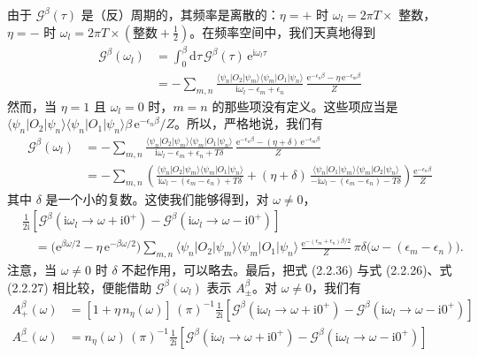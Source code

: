 由于 $\mathcal{G}^{\beta}(\tau)$ 是（反）周期的，其频率是离散的：$\eta = +$ 时 $\omega_l = 2\pi T \times$ 整数，$\eta = -$ 时 $\omega_l = 2\pi T \times (\text{整数} + \frac{1}{2})$。在频率空间中，我们天真地得到
\begin{align*}
\mathcal{G}^{\beta}(\omega_l) &= \int_0^{\beta} \mathrm{d}\tau\, \mathcal{G}^{\beta}(\tau)\, \mathrm{e}^{\mathrm{i}\omega_l \tau}
\\
&= -\sum_{m,n} \frac{\langle\psi_n|O_2|\psi_m\rangle\langle\psi_m|O_1|\psi_n\rangle}{\mathrm{i}\omega_l - \epsilon_m + \epsilon_n}\, \frac{\mathrm{e}^{-\epsilon_n\beta} - \eta\,\mathrm{e}^{-\epsilon_m\beta}}{Z}
\end{align*}
然而，当 $\eta = 1$ 且 $\omega_l = 0$ 时，$m = n$ 的那些项没有定义。这些项应当是 $\langle\psi_n|O_2|\psi_n\rangle\allowbreak\langle\psi_n|O_1|\psi_n\rangle \beta\allowbreak\, \mathrm{e}^{-\epsilon_n\beta}/Z$。所以，严格地说，我们有
\begin{align*}
\mathcal{G}^{\beta}(\omega_l) &= -\sum_{m,n} \frac{\langle\psi_n|O_2|\psi_m\rangle\langle\psi_m|O_1|\psi_n\rangle}{\mathrm{i}\omega_l - \epsilon_m + \epsilon_n + T\delta}\, \frac{\mathrm{e}^{-\epsilon_n\beta} - (\eta + \delta)\,\mathrm{e}^{-\epsilon_m\beta}}{Z} \tag{2.2.35}
\\
&= -\sum_{m,n} \left( \frac{\langle\psi_n|O_2|\psi_m\rangle\langle\psi_m|O_1|\psi_n\rangle}{\mathrm{i}\omega_l - (\epsilon_m - \epsilon_n) + T\delta} + (\eta + \delta)\, \frac{\langle\psi_n|O_1|\psi_m\rangle\langle\psi_m|O_2|\psi_n\rangle}{-\mathrm{i}\omega_l - (\epsilon_m - \epsilon_n) - T\delta} \right) \frac{\mathrm{e}^{-\epsilon_n\beta}}{Z}
\end{align*}
其中 $\delta$ 是一个小的复数。这使我们能够得到，对 $\omega \neq 0$，
\begin{align*}
&\frac{1}{2\mathrm{i}}\left[ \mathcal{G}^{\beta}(\mathrm{i}\omega_l \to \omega + \mathrm{i}0^{+}) - \mathcal{G}^{\beta}(\mathrm{i}\omega_l \to \omega - \mathrm{i}0^{+}) \right] \tag{2.2.36}
\\
&\quad = \bigl(\mathrm{e}^{\beta\omega/2} - \eta\,\mathrm{e}^{-\beta\omega/2}\bigr) \sum_{m,n} \langle\psi_n|O_2|\psi_m\rangle\langle\psi_m|O_1|\psi_n\rangle\, \frac{\mathrm{e}^{-(\epsilon_m + \epsilon_n)\beta/2}}{Z}\, \pi\delta\bigl(\omega - (\epsilon_m - \epsilon_n)\bigr).
\end{align*}
注意，当 $\omega \neq 0$ 时 $\delta$ 不起作用，可以略去。最后，把式 (2.2.36) 与式 (2.2.26)、式 (2.2.27) 相比较，便能借助 $\mathcal{G}^{\beta}(\omega_l)$ 表示 $A^{\beta}_{\pm}$。对 $\omega \neq 0$，我们有
\begin{equation*}
\boxed{
\begin{aligned}
A^{\beta}_{+}(\omega) &= [1 + \eta\, n_{\eta}(\omega)]\,(\pi)^{-1} \frac{1}{2\mathrm{i}}\left[ \mathcal{G}^{\beta}(\mathrm{i}\omega_l \to \omega + \mathrm{i}0^{+}) - \mathcal{G}^{\beta}(\mathrm{i}\omega_l \to \omega - \mathrm{i}0^{+}) \right]
\\
A^{\beta}_{-}(\omega) &= n_{\eta}(\omega)\,(\pi)^{-1} \frac{1}{2\mathrm{i}}\left[ \mathcal{G}^{\beta}(\mathrm{i}\omega_l \to \omega + \mathrm{i}0^{+}) - \mathcal{G}^{\beta}(\mathrm{i}\omega_l \to \omega - \mathrm{i}0^{+}) \right]
\end{aligned}
} \tag{2.2.37}
\end{equation*}
